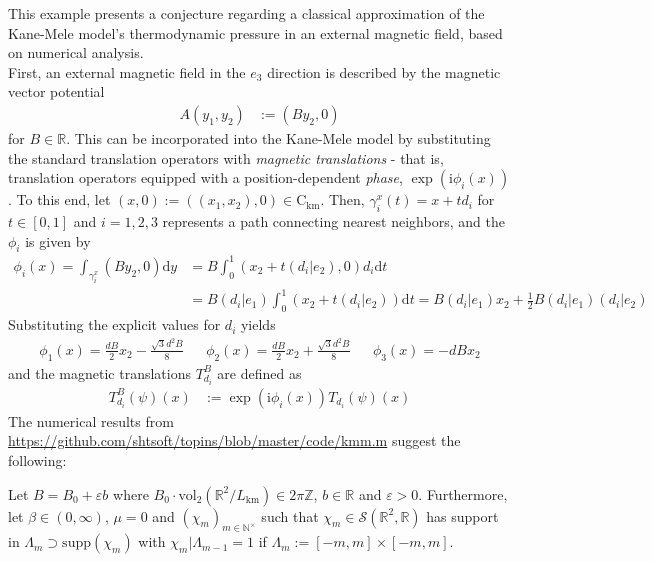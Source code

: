 \begin{exa}
\label{exa:tdpressure}
This example presents a conjecture regarding a classical approximation of the Kane-Mele model's thermodynamic pressure in an external magnetic field, based on numerical analysis.
\\
First, an external magnetic field in the $e_{3}$ direction is described by the magnetic vector potential
\begin{align*}
  A(y_{1},y_{2})
  &:=
  (By_{2},0)
\end{align*}
for $B \in \mathbb{R}$.
  This can be incorporated into the Kane-Mele model by substituting the standard translation operators with \textit{magnetic translations} - that is, translation operators equipped with a position-dependent \textit{phase}, $\exp(\mathrm{i}\phi_{i}(x))$.
To this end, let $(x,0) := ((x_{1},x_{2}),0) \in \mathrm{C}_{\textrm{km}}$.
Then, $\gamma_{i}^{x}(t) = x +td_{i}$ for $t \in [0,1]$ and $i =1,2,3$ represents a path connecting nearest neighbors, and the $\phi_{i}$ is given by
\begin{align*}
  \phi_{i}(x)
  =
  \int_{\gamma_{i}^{x}}
  (By_{2},0)
  \mathrm{d}y
  &=
  B
  \int_{0}^{1}
  (x_{2}+t(d_{i} \vert e_{2}),0)
  d_{i}
  \mathrm{d}t
  \\
  &=
  B
  (d_{i} \vert e_{1})
  \int_{0}^{1}
  (x_{2}+t(d_{i} \vert e_{2}))
  \mathrm{d}t
  =
  B
  (d_{i} \vert e_{1})
  x_{2}
  +
  \frac{1}{2}
  B
  (d_{i} \vert e_{1})
  (d_{i} \vert e_{2})
\end{align*}
Substituting the explicit values for $d_{i}$ yields
\begin{align*}
  \phi_{1}(x)
  =
  \frac{dB}{2}
  x_{2}
  -
  \frac{\sqrt{3}d^{2}B}{8}
  &&
  \phi_{2}(x)
  =
  \frac{dB}{2}
  x_{2}
  +
  \frac{\sqrt{3}d^{2}B}{8}
  &&
  \phi_{3}(x)
  =
  -
  dBx_{2}
\end{align*}
and the magnetic translations $T_{d_{i}}^{B}$ are defined as
\begin{align*}
  T_{d_{i}}^{B}(\psi)(x)
  &:=
  \exp(\mathrm{i}\phi_{i}(x))
  T_{d_{i}}(\psi)(x)
\end{align*}
The numerical results from \href{https://github.com/shtsoft/topins/blob/master/code/kmm.m}{https://github.com/shtsoft/topins/blob/master/code/kmm.m} suggest the following:
\\
\begin{con}
\label{con:pressofkmm}
Let $B = B_{0} + \varepsilon b$ where $B_{0} \cdot \mathrm{vol}_{2}(\mathbb{R}^{2}/L_{\textrm{km}}) \in 2\pi\mathbb{Z}$, $b \in \mathbb{R}$ and $\varepsilon > 0$.
Furthermore, let $\beta \in (0,\infty)$, $\mu = 0$ and $(\chi_{m})_{m\in\mathbb{N}^{\times}}$ such that $\chi_{m} \in \mathcal{S}(\mathbb{R}^{2},\mathbb{R})$ has support in $\Lambda_{m} \supset \mathrm{supp}(\chi_{m})$ with $\chi_{m} \vert \Lambda_{m-1} = 1$ if $\Lambda_{m} := [-m,m] \times [-m,m]$.

\end{con}
\end{exa}
